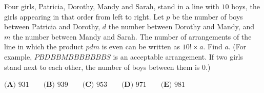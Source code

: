 Four girls, Patricia, Dorothy, Mandy and Sarah, stand in a line with $10$ boys, the girls appearing in that order from left to right. Let $p$ be the number of boys between Patricia and Dorothy, $d$ the number between Dorothy and Mandy, and $m$ the number between Mandy and Sarah. The number of arrangements of the line in which the product $pdm$ is even can be written as $10!\times a$. Find $a$. (For example, $PBDBBMBBBBBBBS$ is an acceptable arrangement. If two girls stand next to each other, the number of boys between them is $0$.)

$\textbf{(A) }931\qquad\textbf{(B) }939\qquad\textbf{(C) }953\qquad\textbf{(D) }971\qquad\textbf{(E) }981$
